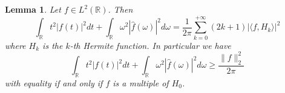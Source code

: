 \documentclass[corpo=11pt, stile=classica, tipotesi=custom,
greek, evenboxes, english]{toptesi}
\numberwithin{equation}{chapter}
\newtheorem{lem}[teo]{Lemma}
\theoremstyle{remark}
\newcommand{\R}{\mathbb{R}} %
\begin{document}
\begin{lem}\label{Heisenberg's uncertainty principle lemma}
	Let $f \in L^2(\R)$. Then
	\begin{equation}\label{Heisenberg's uncertainty principle lemma formula}
		\int_{\R} t^2 |f(t)|^2dt + \int_{\R} \omega^2 |\hat{f}(\omega)|^2d\omega = \dfrac{1}{2\pi} \sum_{k=0}^{+\infty} (2k+1)|\langle f,H_k \rangle|^2
	\end{equation}
	where $H_k$ is the $k$-th Hermite function. In particular we have
	\begin{equation}\label{Heisenberg's uncertainty principle lemma inequality}
		\int_{\R} t^2 |f(t)|^2dt + \int_{\R} \omega^2 |\hat{f}(\omega)|^2d\omega \geq \dfrac{\|f\|_2^2}{2\pi}
	\end{equation}
	with equality if and only if $f$ is a multiple of $H_0$.
\end{lem}
\end{document}
